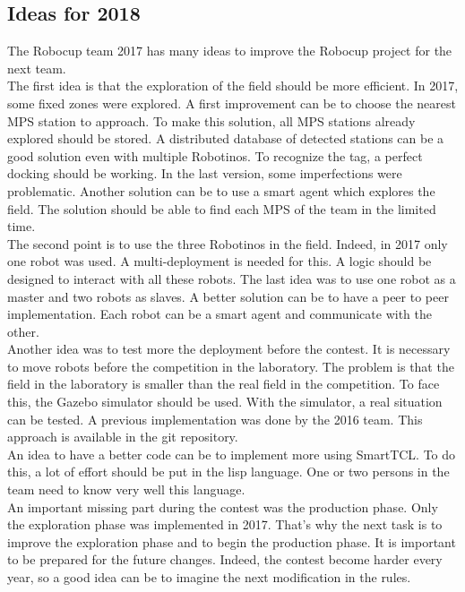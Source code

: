 \subsection{Ideas for 2018}

The Robocup team 2017 has many ideas to improve the Robocup project for the next team.\\

The first idea is that the exploration of the field should be more efficient. In 2017, some fixed zones were explored. A first improvement can be to choose the nearest MPS station to approach. To make this solution, all MPS stations already explored should be stored. A distributed database of detected stations can be a good solution even with multiple Robotinos. To recognize the tag, a perfect docking should be working. In the last version, some imperfections were problematic. Another solution can be to use a smart agent which explores the field. The solution should be able to find each MPS of the team in the limited time.\\

The second point is to use the three Robotinos in the field. Indeed, in 2017 only one robot was used. A multi-deployment is needed for this. A logic should be designed to interact with all these robots. The last idea was to use one robot as a master and two robots as slaves. A better solution can be to have a peer to peer implementation. Each robot can be a smart agent and communicate with the other.\\

Another idea was to test more the deployment before the contest. It is necessary to move robots before the competition in the laboratory. The problem is that the field in the laboratory is smaller than the real field in the competition. To face this, the Gazebo simulator should be used. With the simulator, a real situation can be tested. A previous implementation was done by the 2016 team. This approach is available in the git repository.\\

An idea to have a better code can be to implement more using SmartTCL. To do this, a lot of effort should be put in the lisp language. One or two persons in the team need to know very well this language. \\

An important missing part during the contest was the production phase. Only the exploration phase was implemented in 2017. That's why the next task is to improve the exploration phase and to begin the production phase. It is important to be prepared for the future changes. Indeed, the contest become harder every year, so a good idea can be to imagine the next modification in the rules.\\